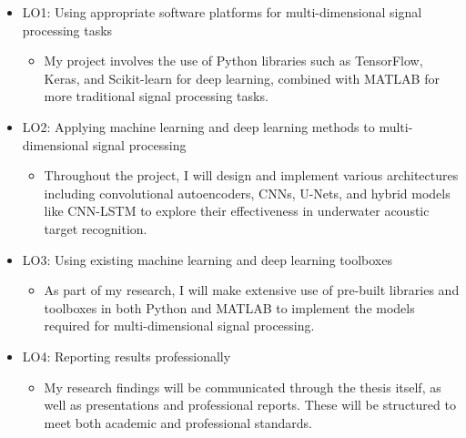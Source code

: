 \begin{itemize}
    \item LO1: Using appropriate software platforms for multi-dimensional signal processing tasks
    \begin{itemize}
        \item My project involves the use of Python libraries such as TensorFlow, Keras, and Scikit-learn for deep learning, combined with MATLAB for more traditional signal processing tasks.
    \end{itemize}
    \item LO2: Applying machine learning and deep learning methods to multi-dimensional signal processing
    \begin{itemize}
        \item Throughout the project, I will design and implement various architectures including convolutional autoencoders, CNNs, U-Nets, and hybrid models like CNN-LSTM to explore their effectiveness in underwater acoustic target recognition.
    \end{itemize}
    \item LO3: Using existing machine learning and deep learning toolboxes
    \begin{itemize}
        \item As part of my research, I will make extensive use of pre-built libraries and toolboxes in both Python and MATLAB to implement the models required for multi-dimensional signal processing.
    \end{itemize}
    \item LO4: Reporting results professionally
    \begin{itemize}
        \item My research findings will be communicated through the thesis itself, as well as presentations and professional reports. These will be structured to meet both academic and professional standards. 
    \end{itemize}
\end{itemize}